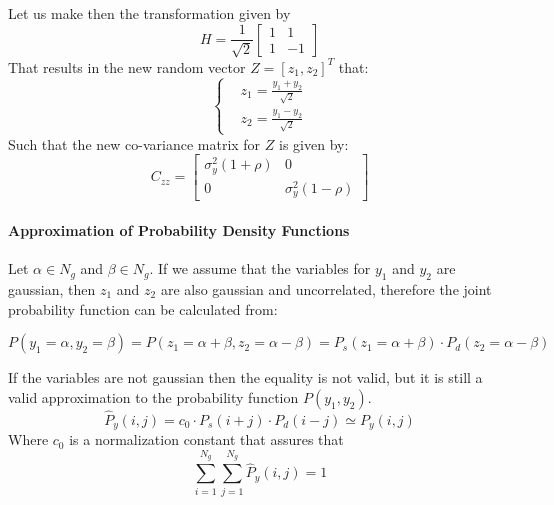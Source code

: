 Let us make then the transformation given by
\begin{equation}
H =\frac{1}{\sqrt{2}} 
\begin{bmatrix}
1&1\\
1&-1
\end{bmatrix}{}
\end{equation}
That results in the new random vector $Z=[z_1, z_2]^T$ that:
\begin{equation}
\begin{cases}
&z_1 =\frac{y_1+y_2}{\sqrt{2}}\\
&z_2 = \frac{y_1-y_2}{\sqrt{2}}
\end{cases}
\end{equation}
Such that the new co-variance matrix for $Z$ is given by:
\begin{equation}
C_{zz}=
    \begin{bmatrix}
    \sigma_y^2 (1+\rho) & 0\\
    0 & \sigma_y^2 (1-\rho)
    \end{bmatrix}{}
\end{equation}{}

\paragraph{Approximation of Probability Density Functions}
Let $\alpha \in N_g$ and $\beta \in N_g$.
If we assume that the variables for $y_1$ and $y_2$ are gaussian, then $z_1$ and $z_2$ are also gaussian and uncorrelated, therefore the joint probability function can be calculated from:

\begin{equation}
P(y_1=\alpha, y_2=\beta) = P(z_1=\alpha + \beta, z_2=\alpha - \beta) = P_s(z_1=\alpha+\beta)\cdot P_d(z_2=\alpha-\beta) 
\end{equation}

If the variables are not gaussian then the equality is not valid, but it is still a valid approximation to the probability function $P(y_1, y_2)$. 
\begin{equation}
    \hat{P}_y(i,j) = c_0\cdot P_s(i+j) \cdot P_d(i-j) \simeq P_y(i,j)
    \label{approximation_gaussian}
\end{equation}{}
Where $c_0$ is a normalization constant that assures that
\begin{equation}
    \sum_{i=1}^{N_g}\sum_{j=1}^{N_g} \hat{P}_y(i,j) = 1
\end{equation}{}

